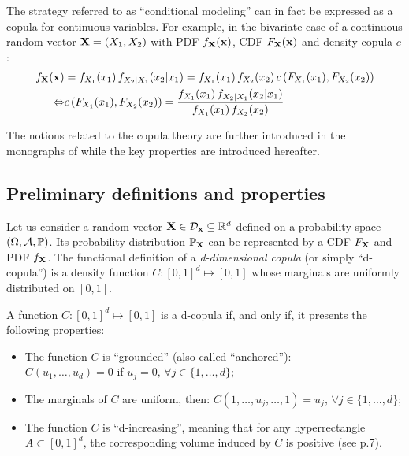\begin{remark}
    The strategy referred to as ``conditional modeling'' can in fact be expressed as a copula \citep{vanem_2016} for continuous variables. For example, in the bivariate case of a continuous random vector ${\bf X} = (X_1, X_2)$ with PDF $f_{\bf X}({\bf x})$, CDF $F_{\bf X}({\bf x})$ and density copula $c$: 
    \begin{subequations}
        \begin{align}
            f_{\bf X}({\bf x}) &= f_{X_1}(x_1) \, f_{X_2|X_1}(x_2|x_1) = f_{X_1}(x_1) \, f_{X_2}(x_2) \, c\left(F_{X_1}(x_1), F_{X_2}(x_2)\right)\\
            \Leftrightarrow & c\left(F_{X_1}(x_1), F_{X_2}(x_2)\right) = \frac{f_{X_1}(x_1) \, f_{X_2|X_1}(x_2|x_1)}{f_{X_1}(x_1) \, f_{X_2}(x_2)}
        \end{align}  
    \end{subequations}
\end{remark}

The notions related to the copula theory are further introduced in the monographs of \citet{nelsen_2006_copulas,joe_2014,durante_2015_copula} while the key properties are introduced hereafter.


\subsection{Preliminary definitions and properties}\label{sec:copula_prelims}
Let us consider a random vector ${\bf X} \in \mathcal{D}_{{\bf x}}\subseteq\mathbb{R}^d$ defined on a probability space $(\Omega, \mathcal{A}, \mathbb{P})$. 
Its probability distribution $\mathbb{P}_{\bf X}$ can be represented by a CDF $F_{\bf X}$ and PDF $f_{\bf X}$. 
The functional definition of a \textit{d-dimensional copula} (or simply ``d-copula'') is a density function $C:[0, 1]^d \mapsto [0, 1]$ whose marginals are uniformly distributed on $[0, 1]$.
\begin{theorem}[Copula]
    A function $C:[0, 1]^d \mapsto [0, 1]$ is a d-copula if, and only if, it presents the following properties:
    \begin{itemize}
        \item The function $C$ is ``grounded'' (also called ``anchored''): \\$C(u_1, \dots, u_d) = 0$ if $u_j=0, \, \forall j\in\{1, \dots, d\}$;
        \item The marginals of $C$ are uniform, then: $C(1, \dots, u_j, \dots, 1) = u_j,  \, \forall j\in\{1, \dots, d\}$;
        \item The function $C$ is ``d-increasing'', meaning that for any hyperrectangle $A \subset [0, 1]^d$, the corresponding volume induced by $C$ is positive (see \cite{durante_2015_copula} p.7). 
    \end{itemize}
    \label{thm:copula}
\end{theorem}

